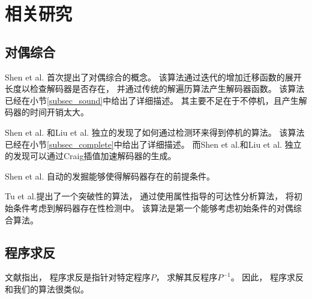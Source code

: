 \chapter{相关研究}
\label{chap:2}
%
%

\section{对偶综合}\label{subsec_compsyn_relat}
Shen et al. 首次提出了对偶综合的概念。
该算法通过迭代的增加迁移函数的展开长度以检查解码器是否存在，
并通过传统的解遍历算法产生解码器函数。
该算法已经在小节\ref{subsec_sound}中给出了详细描述。
其主要不足在于不停机，且产生解码器的时间开销太大。

Shen et al. 和Liu et al. 独立的发现了如何通过检测环来得到停机的算法。
该算法已经在小节\ref{subsec_complete}中给出了详细描述。
而Shen et al.和Liu et al. 独立的发现可以通过Craig插值加速解码器的生成。

Shen et al.  自动的发掘能够使得解码器存在的前提条件。

Tu et al.提出了一个突破性的算法，
通过使用属性指导的可达性分析算法，
将初始条件考虑到解码器存在性检测中。
该算法是第一个能够考虑初始条件的对偶综合算法。

\section{程序求反}\label{subsec_proinv}
文献指出，
程序求反是指针对特定程序$P$，
求解其反程序$P^{-1}$。
因此，
程序求反和我们的算法很类似。

